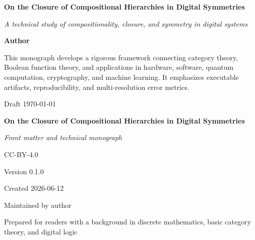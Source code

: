 \thispagestyle{empty}
\begin{titlepage}
\centering
\vspace*{0.12\textheight}

{\Huge\bfseries On the Closure of Compositional Hierarchies in Digital Symmetries\par}
\vspace{1.15em}

{\Large\itshape A technical study of compositionality, closure, and symmetry in digital systems\par}
\vspace{2.0em}

{\large\textbf{Author}\par}
\vfill

\begin{minipage}{0.84\textwidth}
\centering
This monograph develops a rigorous framework connecting category theory, Boolean function theory,
and applications in hardware, software, quantum computation, cryptography, and machine learning.
It emphasizes executable artifacts, reproducibility, and multi-resolution error metrics.
\end{minipage}

\vfill

{\large Draft \;\textbullet\; \today\par}
\vspace*{0.08\textheight}
\end{titlepage}

\cleardoublepage
\thispagestyle{empty}
\begin{titlepage}
\centering
\vspace*{0.18\textheight}

{\Huge\bfseries On the Closure of Compositional Hierarchies in Digital Symmetries\par}
\vspace{1.05em}
{\Large\itshape Front matter and technical monograph\par}
\vspace{1.8em}

{\large CC-BY-4.0\par}
\vspace{0.8em}
{\large Version 0.1.0\par}
\vspace{0.8em}
{\large Created 2026-06-12\par}
\vspace{0.8em}
{\large Maintained by author\par}

\vfill

{\large Prepared for readers with a background in discrete mathematics, basic category theory,
and digital logic\par}

\vspace*{0.12\textheight}
\end{titlepage}
